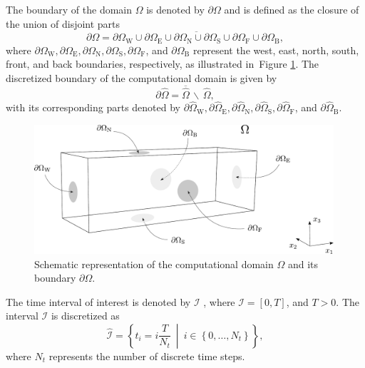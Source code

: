 The boundary of the domain $ \Omega $ is denoted by $ \partial \Omega $ and is defined as the closure of the union of disjoint parts 
\begin{equation}\label{eq:border decomposition}
	\partial \Omega = \overline{\partial \Omega_{\mathrm{W}} \cup \partial \Omega_{\mathrm{E}} \cup \partial \Omega_{\mathrm{N}} \cup \partial \Omega_{\mathrm{S}} \cup \partial \Omega_{\mathrm{F}} \cup \partial \Omega_{\mathrm{B}}},
\end{equation}
where $\partial \Omega_{\mathrm{W}} , \partial \Omega_{\mathrm{E}} , \partial \Omega_{\mathrm{N}}, \partial \Omega_{\mathrm{S}}, \partial \Omega_{\mathrm{F}}$, and $  \partial \Omega_{\mathrm{B}} $ represent the west, east, north, south, front, and back boundaries, respectively, as illustrated in~Figure \ref{fig:domain}. The discretized boundary of the computational domain is given by
\begin{equation}\label{eq:border}
	\partial\hat{\Omega} = \overline{\hat{\Omega}} \, \backslash \, \hat{\Omega},
\end{equation}
with its corresponding parts denoted by $ \partial \hat{\Omega}_{\mathrm{W}} , \partial \hat{\Omega}_{\mathrm{E}} , \partial \hat{\Omega}_{\mathrm{N}}, \partial \hat{\Omega}_{\mathrm{S}}, \partial \hat{\Omega}_{\mathrm{F}}$,  and $ \partial \hat{\Omega}_{\mathrm{B}} $.
\begin{figure}[H]
	\centering
	\includegraphics[width=0.99\textwidth]{figures/omega.pdf}
	\caption{Schematic representation of the computational domain $ \Omega $ and its boundary $ \partial \Omega $.}  
	\label{fig:domain}
	\vspace{1.8mm}
\end{figure}

The time interval of interest is denoted by $ \mathcal{I} $ , where ${\mathcal{I} = [ 0, T ]}$, and $ T > 0 $. The interval $ \mathcal{I} $ is discretized as
\begin{equation}\label{eq:timediscrete}
	\hat{\mathcal{I}} = \left\{ t_{i} = i \frac{T}{N_t} \ \middle| \ i \in \left\{0, \dots, N_{t} \right\} \right\},
\end{equation}
where $ N_t $ represents the number of discrete time steps.


